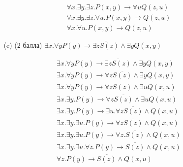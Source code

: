 \begin{enumerate}
\begin{itemize}
\begin{solution}
\begin{align*}
                &\forall x . \exists y . \exists z . P(x, y) \rightarrow \forall u Q(z, u) \\
                &\forall x . \exists y . \exists z . \forall u . P(x, y) \rightarrow Q(z, u) \\
                &\forall x . \forall u . P(x, y) \rightarrow Q(z, u)
            \end{align*}
        \end{solution}
        \item[(c)] (2 балла) $\exists x. \forall y P(y) \rightarrow \overline{\exists z S(z)} \land \exists y Q(x, y)$
        \begin{solution}
            \begin{align*}
                &\exists x. \forall y P(y) \rightarrow \overline{\exists z S(z)} \land \exists y Q(x, y) \\
                &\exists x. \forall y P(y) \rightarrow \forall z \overline{S(z)} \land \exists y Q(x, y) \\
                &\exists x. \forall y P(y) \rightarrow \forall z \overline{S(z)} \land \exists u Q(x, u) \\
                &\exists x. \exists y . P(y) \rightarrow \forall z \overline{S(z)} \land \exists u Q(x, u) \\
                &\exists x. \exists y . P(y) \rightarrow \exists u . \forall z \overline{S(z)} \land  Q(x, u) \\
                &\exists x. \exists y . \exists u . P(y) \rightarrow \forall z \overline{S(z)} \land  Q(x, u) \\
                &\exists x. \exists y . \exists u . P(y) \rightarrow \forall z . \overline{S(z)} \land  Q(x, u) \\
                &\exists x. \exists y . \exists u . \forall z . P(y) \rightarrow \overline{S(z)} \land  Q(x, u) \\
                &\forall z . P(y) \rightarrow \overline{S(z)} \land  Q(x, u)
            \end{align*}
        \end{solution}
    \end{itemize}
\end{enumerate}
\clearpage
